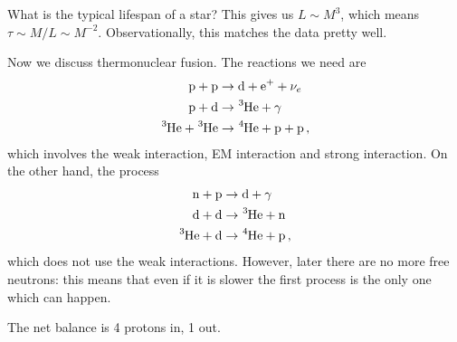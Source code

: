 \documentclass[main.tex]{subfiles}
\begin{document}
What is the typical lifespan of a star? This gives us \(L \sim M^3\), which means \(\tau \sim M/L \sim M^{-2}\). 
Observationally, this matches the data pretty well. 

Now we discuss thermonuclear fusion. The reactions we need are 
%
\begin{align}
  \ce{p + p} &\rightarrow \ce{d + e+ +} \nu_e  \\
  \ce{p + d} &\rightarrow \ce{^3He +} \gamma  \\
  \ce{^3He + ^3He} &\rightarrow \ce{^4He + p + p} 
\,,
\end{align}
%
which involves the weak interaction, EM interaction and strong interaction. On the other hand, the process 
%
\begin{align}
  \ce{n + p} &\rightarrow \ce{d} + \gamma   \\
  \ce{d + d} &\rightarrow \ce{^3He + n}  \\
  \ce{^3He + d}  &\rightarrow \ce{^4He + p}
\,,
\end{align}
%
which does not use the weak interactions. However, later there are no more free neutrons: this means that even if it is slower the first process is the only one which can happen. 

The net balance is 4 protons in, 1  out. 
\end{document}
